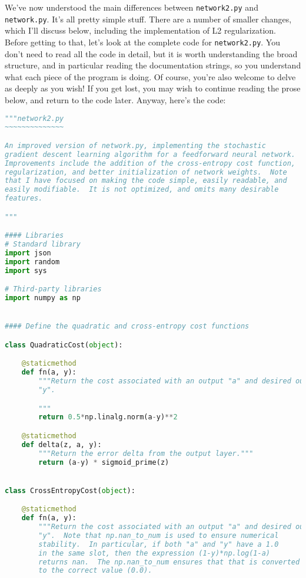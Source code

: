 We've now understood the main differences between \lstinline{network2.py} and \lstinline{network.py}. It's all pretty simple stuff. There are a number of smaller changes, which I'll discuss below, including the implementation of L2 regularization. Before getting to that, let's look at the complete code for \lstinline{network2.py}. You don't need to read all the code in detail, but it is worth understanding the broad structure, and in particular reading the documentation strings, so you understand what each piece of the program is doing. Of course, you're also welcome to delve as deeply as you wish! If you get lost, you may wish to continue reading the prose below, and return to the code later. Anyway, here's the code:

\begin{fullwidth}
\begin{lstlisting}[caption={network2.py (Python 2.7)},label={lst:network2.py}, language=Python]
"""network2.py
~~~~~~~~~~~~~~

An improved version of network.py, implementing the stochastic
gradient descent learning algorithm for a feedforward neural network.
Improvements include the addition of the cross-entropy cost function,
regularization, and better initialization of network weights.  Note
that I have focused on making the code simple, easily readable, and
easily modifiable.  It is not optimized, and omits many desirable
features.

"""

#### Libraries
# Standard library
import json
import random
import sys

# Third-party libraries
import numpy as np


#### Define the quadratic and cross-entropy cost functions

class QuadraticCost(object):

    @staticmethod
    def fn(a, y):
        """Return the cost associated with an output "a" and desired output
        "y".

        """
        return 0.5*np.linalg.norm(a-y)**2

    @staticmethod
    def delta(z, a, y):
        """Return the error delta from the output layer."""
        return (a-y) * sigmoid_prime(z)


class CrossEntropyCost(object):

    @staticmethod
    def fn(a, y):
        """Return the cost associated with an output "a" and desired output
        "y".  Note that np.nan_to_num is used to ensure numerical
        stability.  In particular, if both "a" and "y" have a 1.0
        in the same slot, then the expression (1-y)*np.log(1-a)
        returns nan.  The np.nan_to_num ensures that that is converted
        to the correct value (0.0).


\end{lstlisting}
\end{fullwidth}
